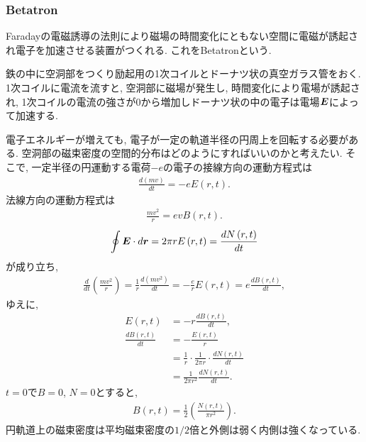\documentclass[10pt,a4paper]{jsarticle}
\begin{document}
\subsubsection{Betatron}
Faradayの電磁誘導の法則により磁場の時間変化にともない空間に電磁が誘起され電子を加速させる装置がつくれる. これをBetatronという. \par
鉄の中に空洞部をつくり励起用の1次コイルとドーナツ状の真空ガラス管をおく. 1次コイルに電流を流すと, 空洞部に磁場が発生し, 時間変化により電場が誘起され, 1次コイルの電流の強さが$0$から増加しドーナツ状の中の電子は電場$\bm{E}$によって加速する. \par
電子エネルギーが増えても, 電子が一定の軌道半径の円周上を回転する必要がある. 空洞部の磁束密度の空間的分布はどのようにすればいいのかと考えたい. そこで, 一定半径の円運動する電荷$-e$の電子の接線方向の運動方程式は
\begin{align*}
    \frac{d \left( mv \right)}{dt} = - e E \left( r, t \right). 
\end{align*}
法線方向の運動方程式は
\begin{align*}
    \frac{mv^2}{r} = ev B \left( r, t \right).
\end{align*}
\begin{align*}
    \oint \bm{E} \cdot d \bm{r} = 2\pi r E \left( r, t \right) = \frac{dN \left( r, t \right)}{dt}
\end{align*}
が成り立ち, 
\begin{align*}
    \frac{d}{dt} \left( \frac{mv^2}{r} \right) = \frac{1}{r} \frac{d \left( mv^2 \right)}{dt} = -\frac{e}{r} E \left( r, t \right) = e \frac{dB \left( r, t \right)}{dt},
\end{align*}
ゆえに, 
\begin{align*}
    E \left( r, t \right) &= - r \frac{dB \left( r, t \right)}{dt}, \\
    \frac{dB \left( r, t \right)}{dt} &= - \frac{E \left( r, t \right)}{r} \\
    &= \frac{1}{r} \cdot \frac{1}{2\pi r} \cdot \frac{d N \left( r, t \right)}{dt} \\
    &= \frac{1}{2\pi r^2} \frac{d N \left( r, t \right)}{dt}.
\end{align*}
$t=0$で$B=0$, $N=0$とすると, 
\begin{align*}
    B \left( r, t \right) = \frac{1}{2} \left( \frac{N \left(r, t \right)}{\pi r^2} \right).
\end{align*}
円軌道上の磁束密度は平均磁束密度の$1/2$倍と外側は弱く内側は強くなっている. 
\end{document}
